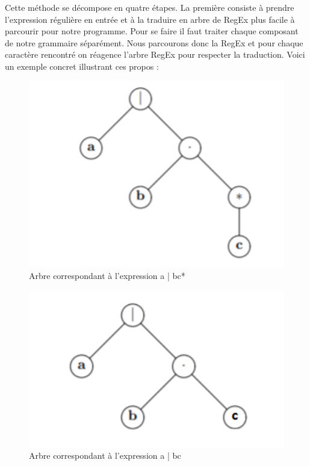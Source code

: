 \documentclass{article}
\begin{document}
Cette méthode se décompose en quatre étapes. La première consiste à prendre l’expression régulière en entrée et à la traduire en arbre de RegEx plus facile à parcourir pour notre programme. Pour se faire il faut traiter chaque composant de notre grammaire séparément. Nous parcourons donc la RegEx et pour chaque caractère
rencontré on réagence l’arbre RegEx pour respecter la traduction. Voici un exemple concret illustrant ces propos :

\begin{figure}[!h]
  \centering
  \includegraphics[width=.3\paperwidth]{abc*.png}
  \caption{Arbre correspondant à l’expression a | bc*}
\end{figure}

\begin{figure}[!h]
  \centering
  \includegraphics[width=.3\paperwidth]{abc.png}
  \caption{Arbre correspondant à l’expression a | bc}
\end{figure}
\end{document}
